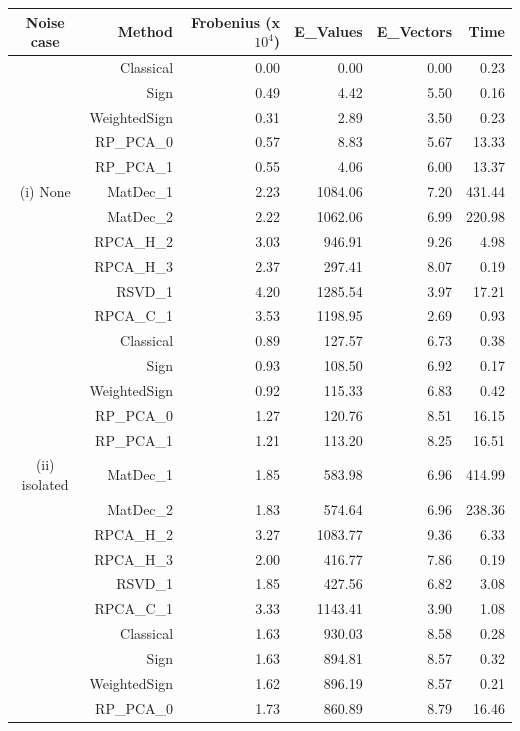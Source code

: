 \documentclass[ss]{imsart}
\theoremstyle{Example}
\begin{document}
\begin{table}[ht]
\centering
\begin{tabular}{c|rrrrr}
  \hline
Noise case & Method & Frobenius (x$10^4$) & E\_Values & E\_Vectors & Time \\ 
  \hline
& Classical & 0.00 & 0.00 & 0.00 & 0.23 \\ 
&   Sign & 0.49 & 4.42 & 5.50 & 0.16 \\ 
&   WeightedSign & 0.31 & 2.89 & 3.50 & 0.23 \\ 
&   RP\_PCA\_0 & 0.57 & 8.83 & 5.67 & 13.33 \\ 
&   RP\_PCA\_1 & 0.55 & 4.06 & 6.00 & 13.37 \\ 
(i) None &   MatDec\_1 & 2.23 & 1084.06 & 7.20 & 431.44 \\ 
&   MatDec\_2 & 2.22 & 1062.06 & 6.99 & 220.98 \\ 
&   RPCA\_H\_2 & 3.03 & 946.91 & 9.26 & 4.98 \\ 
&   RPCA\_H\_3 & 2.37 & 297.41 & 8.07 & 0.19 \\ 
&   RSVD\_1 & 4.20 & 1285.54 & 3.97 & 17.21 \\ 
&   RPCA\_C\_1 & 3.53 & 1198.95 & 2.69 & 0.93 \\ 
   \hline
& Classical & 0.89 & 127.57 & 6.73 & 0.38 \\ 
&   Sign & 0.93 & 108.50 & 6.92 & 0.17 \\ 
&   WeightedSign & 0.92 & 115.33 & 6.83 & 0.42 \\ 
&   RP\_PCA\_0 & 1.27 & 120.76 & 8.51 & 16.15 \\ 
&   RP\_PCA\_1 & 1.21 & 113.20 & 8.25 & 16.51 \\ 
(ii) isolated &   MatDec\_1 & 1.85 & 583.98 & 6.96 & 414.99 \\ 
&   MatDec\_2 & 1.83 & 574.64 & 6.96 & 238.36 \\ 
&   RPCA\_H\_2 & 3.27 & 1083.77 & 9.36 & 6.33 \\ 
&   RPCA\_H\_3 & 2.00 & 416.77 & 7.86 & 0.19 \\ 
&   RSVD\_1 & 1.85 & 427.56 & 6.82 & 3.08 \\ 
&   RPCA\_C\_1 & 3.33 & 1143.41 & 3.90 & 1.08 \\ 
   \hline
& Classical & 1.63 & 930.03 & 8.58 & 0.28 \\ 
&   Sign & 1.63 & 894.81 & 8.57 & 0.32 \\ 
&   WeightedSign & 1.62 & 896.19 & 8.57 & 0.21 \\ 
&   RP\_PCA\_0 & 1.73 & 860.89 & 8.79 & 16.46 \\ 

\end{tabular}
\end{table}
\end{document}
